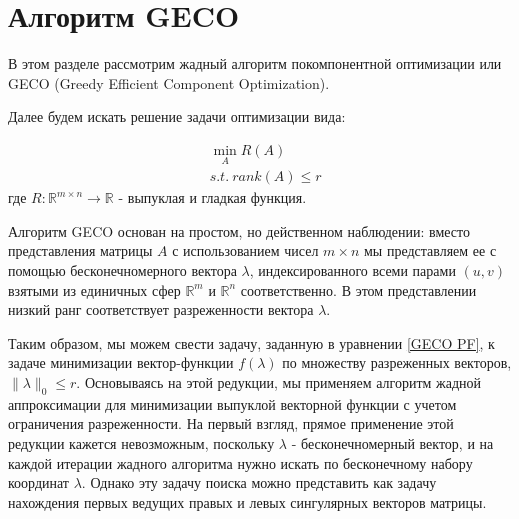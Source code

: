 \documentclass[oneside,final,14pt]{extreport} %
\begin{document}
\section{Алгоритм GECO}

В этом разделе рассмотрим жадный алгоритм покомпонентной оптимизации или GECO (Greedy Efficient Component Optimization).

Далее будем искать решение задачи оптимизации вида:

\begin{equation}
  \label{GECO PF}
  \begin{aligned}
  & \min_A R(A) \\
  & s.t. \ rank(A) \le r
  \end{aligned}
\end{equation}
где $R: \mathbb{R}^{m \times n} \rightarrow \mathbb{R}$ - выпуклая и гладкая функция.


Алгоритм GECO основан на простом, но действенном наблюдении: вместо представления матрицы $A$ с использованием чисел $m \times n$ мы представляем ее с помощью бесконечномерного вектора $\lambda$, индексированного всеми парами $(u, v)$ взятыми из единичных сфер $\mathbb{R}^m$ и $\mathbb{R}^n$ соответственно. В этом представлении низкий ранг соответствует разреженности вектора $\lambda$.

Таким образом, мы можем свести задачу, заданную в уравнении \ref{GECO PF}, к задаче минимизации вектор-функции $f (\lambda)$ по множеству разреженных векторов, $\|\lambda\|_0 \le r$. Основываясь на этой редукции, мы применяем алгоритм жадной аппроксимации для минимизации выпуклой векторной функции с учетом ограничения разреженности. На первый взгляд, прямое применение этой редукции кажется невозможным, поскольку $\lambda$ - бесконечномерный вектор, и на каждой итерации жадного алгоритма нужно искать по бесконечному набору координат $\lambda$. Однако эту задачу поиска можно представить как задачу нахождения первых ведущих правых и левых сингулярных векторов матрицы.
\end{document}

